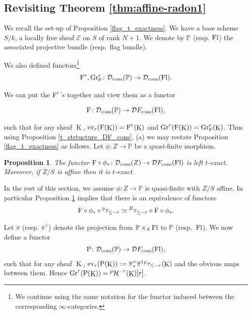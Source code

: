 \documentclass[12pt, reqno]{amsart}
\theoremstyle{plain}
\newtheorem{prop}[thm]{\bf Proposition}
\theoremstyle{definition}
\theoremstyle{definition}
\newcommand{\bbP}{{\mathbb P}}
\newcommand{\cD}{{\mathcal D}}
\newcommand{\cpH}{{^p\mathcal{H}}}
\newcommand{\sE}{{\mathscr E}}
\DeclareMathOperator{\KK}{K}
\begin{document}
\begin{enumerate}[(a)]
\end{enumerate}

\subsection{Revisiting Theorem \ref{thm:affine-radon1}}\label{Revisiting}
We recall the set-up of Proposition \ref{flag_t_exactness}. We have a base scheme $S/k$, a locally free sheaf $\sE$ on $S$ of rank $N+1$. We denote by $\bbP$ (resp. $\textup{Fl}$) the associated projective bundle (resp.~flag bundle).

We also defined functors\footnote{We continue using the same notation for the functor induced between the corresponding $\infty$-categories.} 
\[
\textup{F}^{r}, \textup{Gr}^r_{\textup{F}} \colon \cD_{\textup{cons}}(\bbP) \to \cD_{\textup{cons}}(\textup{Fl}).
\]

We can put the $\textup{F}^r$'s together and view them as a functor 

\[
\textup{F} \colon \cD_{\textup{cons}}(\bbP) \to \cD F_{\textup{cons}}(\textup{Fl}),
\]

\noindent such that for any sheaf $\KK$, $\textup{ev}_r(\textup{F}(\KK))=\textup{F}^r(\KK)$ and $\textup{Gr}^r(\textup{F}(\KK))=\textup{Gr}^r_{\textup{F}}(\KK)$. Thus using Proposition \ref{t_strtucture_DF_cons}, (a) we may restate Proposition \ref{flag_t_exactness} as follows. Let $\phi \colon Z \to \bbP$ be a quasi-finite morphism. 

\begin{prop}\label{prop_revist}
    The functor $\textup{F} \circ \phi_* \colon \cD_{\textup{cons}}(Z) \to \cD F_{\textup{cons}}(\textup{Fl})$ is left $t$-exact. Moreover, if $Z/S$ is affine then it is $t$-exact.
\end{prop}

In the rest of this section, we assume $\phi \colon Z \to \bbP$ is quasi-finite with $Z/S$ affine. In particular Proposition \ref{prop_revist} implies that there is an equivalence of functors
\begin{equation}\label{prop_revisit_1}
    \textup{F} \circ \phi_* \circ {}^p\tau_{\leq -r} \simeq {}^B\tau_{\leq -r}\circ\textup{F}\circ\phi_*.
\end{equation}

Let $\overline{\pi}$ (resp. $\overline{\pi}^{\vee}$) denote the projection from $\bbP \times_S \textup{Fl}$ to $\bbP$ (resp.~$\textup{Fl}$). We now define a functor  
\[
\textup{P} \colon \cD_{\textup{cons}}(\bbP) \to \cD F_{\textup{cons}}(\textup{Fl}),
\]
\noindent such that for any sheaf $\KK$, $\textup{ev}_r(\textup{P}(\KK)):=\overline{\pi}^{\vee}_{*}\overline{\pi}^{\dagger}
{}^p\tau_{\leq -r}(\KK)$ and the obvious maps between them. Hence $\textup{Gr}^r(\textup{P}(\KK))=\cpH^{-r}(\KK)[r]$.
\end{document}
